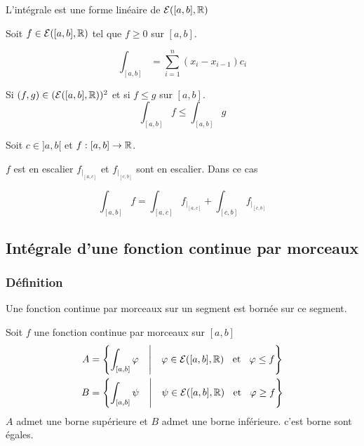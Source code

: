 \begin{prp}
L'intégrale est une forme linéaire de $\mathcal{E}([a, b], \mathbb{R})$
\end{prp}

\begin{prp}
Soit $f \in \mathcal{E}([a, b], \mathbb{R})$ tel que $f \geq 0$ sur $[a, b]$.

\[
    \int_{[a, b]} = \sum^n_{i = 1} (x_i - x_{i - 1}) c_i
\]
\end{prp}

\begin{prp}
Si $(f, g) \in (\mathcal{E}([a, b], \mathbb{R}))^2$ et si $f \leq g$ sur $[a, b]$.
\[
    \int_{[a, b]} f \leq \int_{[a, b]} g
\]
\end{prp}

\begin{prp}
Soit $c \in ]a, b[$ et $f : [a, b] \to \mathbb{R}$.

$f$ est en escalier \ssi $f_{|_{[a, c]}}$ et $f_{|_{[c, b]}}$ sont en escalier.
Dans ce cas

\[
    \int_{[a, b]} f = \int_{[a, c]} f_{|_{[a, c]}}
        + \int_{[c, b]} f_{|_{[c, b]}}
\]
\end{prp}

\subsection{Intégrale d'une fonction continue par morceaux}

\subsubsection{Définition}

\begin{prp}
Une fonction continue par morceaux sur un segment est bornée sur ce
segment.
\end{prp}

\begin{prp}
Soit $f$ une fonction continue par morceaux sur $[a, b]$
\begin{gather*}
    A = \left\{ \int_{[a, b]} \varphi \quad \middle| \quad \varphi \in
        \mathcal{E}([a, b], \mathbb{R}) \;\;\text{ et }\;\; \varphi \leq f \right\} \\
    B = \left\{ \int_{[a, b]} \psi \quad \middle| \quad \psi \in
        \mathcal{E}([a, b], \mathbb{R}) \;\;\text{ et }\;\; \varphi \geq f \right\}
\end{gather*}
$A$ admet une borne supérieure et $B$ admet une borne inférieure. c'est
borne sont égales.
\end{prp}


